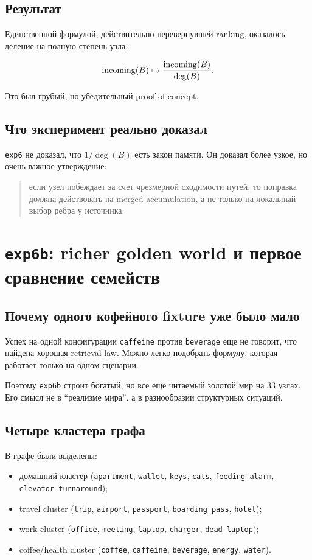 \subsection{Результат}

Единственной формулой, действительно перевернувшей ranking, оказалось деление
на полную степень узла:

\[
\mathrm{incoming}(B)\mapsto \frac{\mathrm{incoming}(B)}{\deg(B)}.
\]

Это был грубый, но убедительный proof of concept.

\subsection{Что эксперимент реально доказал}

\texttt{exp6} не доказал, что $1/\deg(B)$ есть закон памяти. Он доказал более
узкое, но очень важное утверждение:

\begin{quote}
если узел побеждает за счет чрезмерной сходимости путей, то поправка должна
действовать на merged accumulation, а не только на локальный выбор ребра у
источника.
\end{quote}

\section{\texttt{exp6b}: richer golden world и первое сравнение семейств}

\subsection{Почему одного кофейного fixture уже было мало}

Успех на одной конфигурации \texttt{caffeine} против \texttt{beverage} еще не
говорит, что найдена хорошая retrieval law. Можно легко подобрать формулу,
которая работает только на одном сценарии.

Поэтому \texttt{exp6b} строит богатый, но все еще читаемый золотой мир на 33
узлах. Его смысл не в ``реализме мира'', а в разнообразии структурных ситуаций.

\subsection{Четыре кластера графа}

В графе были выделены:

\begin{itemize}[leftmargin=2em]
\item домашний кластер (\texttt{apartment}, \texttt{wallet}, \texttt{keys},
\texttt{cats}, \texttt{feeding alarm}, \texttt{elevator turnaround});
\item travel cluster (\texttt{trip}, \texttt{airport}, \texttt{passport},
\texttt{boarding pass}, \texttt{hotel});
\item work cluster (\texttt{office}, \texttt{meeting}, \texttt{laptop},
\texttt{charger}, \texttt{dead laptop});
\item coffee/health cluster (\texttt{coffee}, \texttt{caffeine},
\texttt{beverage}, \texttt{energy}, \texttt{water}).
\end{itemize}

